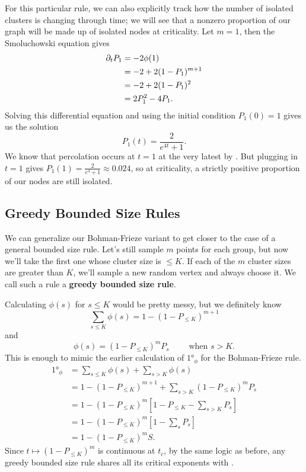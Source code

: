 \documentclass[twoside,10pt]{article}
\newcommand{\BF}{Bohman-Frieze\xspace}
\begin{document}
\begin{ex}[]
	\label{nonzero-at-criticality}
For this particular rule, we can also explicitly track how the number of isolated clusters is changing through time; we will see that a nonzero proportion of our graph will be made up of isolated nodes at criticality. Let $m=1$, then the Smoluchowski equation gives
\begin{align*}
        \partial_{t}{P_1} &= -2 \phi(1) \\
                    &= -2 + 2(1-P_1)^{m+1} \\
                    &= -2 + 2(1-P_1)^{2} \\
                    &= 2P_1^{2} - 4P_1.
\end{align*}
Solving this differential equation and using the initial condition $P_1(0)=1$ gives us the solution
\[
        P_1(t) = \frac{2}{e^{4t}+1} .
\]
We know that percolation occurs at $t=1$ at the very latest by \cite{RW-cont}. But plugging in $t=1$ gives $P_1(1) = \frac{2}{e^{4}+1} \approx 0.024$, so at criticality, a strictly positive proportion of our nodes are still isolated.
\end{ex}

\subsection{Greedy Bounded Size Rules}
\label{greedy-rules}

We can generalize our \BF variant to get closer to the case of a general bounded size rule. Let's still sample $m$ points for each group, but now we'll take the first one whose cluster size is $\leq K$. If each of the $m$ cluster sizes are greater than $K$, we'll sample a new random vertex and always choose it. We call such a rule a \textbf{greedy bounded size rule}.

Calculating $\phi(s)$ for $s \leq K$ would be pretty messy, but we definitely know
\[
        \sum_{s \leq K} \phi(s) = 1 - (1-P_{\leq K})^{m+1}
\] and
\[
        \phi(s) = (1-P_{\leq K})^{m}P_{s} \qquad \text{ when } s>K.
\] This is enough to mimic the earlier calculation of $\ang{1}_{\phi}$ for the \BF rule.
\begin{align*}
        \ang{1}_{\phi} &= \sum_{s \leq K}\phi(s) + \sum_{s > K}\phi(s) \\
                       &= 1 - (1-P_{\leq K})^{m+1} + \sum_{s>K}(1-P_{\leq K})^{m}P_s \\
                       &= 1 - (1-P_{\leq K})^{m} \left[ 1 - P_{\leq K}-\sum_{s>K}P_s \right] \\
                       &= 1 - (1-P_{\leq K})^{m} \left[ 1 - \sum_s P_s \right] \\
                       &= 1 - (1-P_{\leq K})^{m} S.
\end{align*}
Since $t \mapsto (1-P_{\leq K})^{m}$ is continuous at $t_c$, by the same logic as before, any greedy bounded size rule shares all its critical exponents with \ER.
\end{document}
